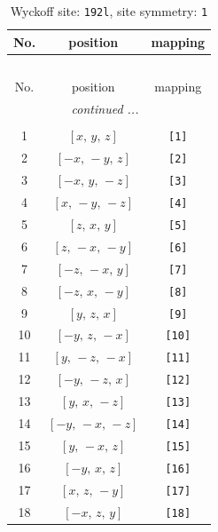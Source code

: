 \documentclass[fleqn,8pt]{jsarticle}
\begin{document}
\renewcommand{\arraystretch}{1.2}
\begin{longtable}{ccc}
\caption{Wyckoff site: {\tt 192l}, site symmetry: {\tt 1}}
 \\
 \hline \hline
No. & position & mapping \\ \hline \endfirsthead

\multicolumn{2}{l}{\tablename\ \thetable{}} \\
 \hline \hline
No. & position & mapping \\ \hline \endhead

 \hline \hline
\multicolumn{2}{r}{\footnotesize\it continued ...} \\ \endfoot

 \hline \hline
\multicolumn{2}{r}{} \\ \endlastfoot

1 & $\left[ x,\, y,\, z \right]$ & {\tt [1]} \\ \hline
2 & $\left[ - x,\, - y,\, z \right]$ & {\tt [2]} \\ \hline
3 & $\left[ - x,\, y,\, - z \right]$ & {\tt [3]} \\ \hline
4 & $\left[ x,\, - y,\, - z \right]$ & {\tt [4]} \\ \hline
5 & $\left[ z,\, x,\, y \right]$ & {\tt [5]} \\ \hline
6 & $\left[ z,\, - x,\, - y \right]$ & {\tt [6]} \\ \hline
7 & $\left[ - z,\, - x,\, y \right]$ & {\tt [7]} \\ \hline
8 & $\left[ - z,\, x,\, - y \right]$ & {\tt [8]} \\ \hline
9 & $\left[ y,\, z,\, x \right]$ & {\tt [9]} \\ \hline
10 & $\left[ - y,\, z,\, - x \right]$ & {\tt [10]} \\ \hline
11 & $\left[ y,\, - z,\, - x \right]$ & {\tt [11]} \\ \hline
12 & $\left[ - y,\, - z,\, x \right]$ & {\tt [12]} \\ \hline
13 & $\left[ y,\, x,\, - z \right]$ & {\tt [13]} \\ \hline
14 & $\left[ - y,\, - x,\, - z \right]$ & {\tt [14]} \\ \hline
15 & $\left[ y,\, - x,\, z \right]$ & {\tt [15]} \\ \hline
16 & $\left[ - y,\, x,\, z \right]$ & {\tt [16]} \\ \hline
17 & $\left[ x,\, z,\, - y \right]$ & {\tt [17]} \\ \hline
18 & $\left[ - x,\, z,\, y \right]$ & {\tt [18]} \\ \hline

\end{longtable}
\end{document}
